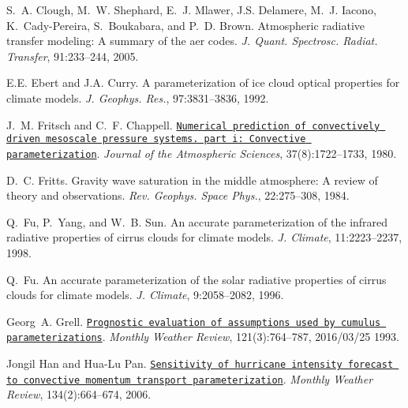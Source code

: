 \begin{DoxyDescription}
\item[\label{_CITEREF_clough_et_al_2005}%
\mbox{[}16\mbox{]}]S.~A. Clough, M.~W. Shephard, E.~J. Mlawer, J.\+S. Delamere, M.~J. Iacono, K.~Cady-\/\+Pereira, S.~Boukabara, and P.~D. Brown. Atmospheric radiative transfer modeling\+: A summary of the aer codes. {\itshape J. Quant. Spectrosc. Radiat. Transfer}, 91\+:233--244, 2005.


\item[\label{_CITEREF_ebert_and_curry_1992}%
\mbox{[}17\mbox{]}]E.\+E. Ebert and J.\+A. Curry. A parameterization of ice cloud optical properties for climate models. {\itshape J. Geophys. Res.}, 97\+:3831--3836, 1992.


\item[\label{_CITEREF_fritsch_and_chappell_1980}%
\mbox{[}18\mbox{]}]J.~M. Fritsch and C.~F. Chappell. \href{http://dx.doi.org/10.1175/1520-0469(1980)037<1722:NPOCDM>2.0.CO;2}{\tt Numerical prediction of convectively driven mesoscale pressure systems. part i\+: Convective parameterization}. {\itshape Journal of the Atmospheric Sciences}, 37(8)\+:1722--1733, 1980. 


\item[\label{_CITEREF_fritts_1984}%
\mbox{[}19\mbox{]}]D.~C. Fritts. Gravity wave saturation in the middle atmosphere\+: A review of theory and observations. {\itshape Rev. Geophys. Space Phys.}, 22\+:275--308, 1984.


\item[\label{_CITEREF_fu_et_al_1998}%
\mbox{[}20\mbox{]}]Q.~Fu, P.~Yang, and W.~B. Sun. An accurate parameterization of the infrared radiative properties of cirrus clouds for climate models. {\itshape J. Climate}, 11\+:2223--2237, 1998.


\item[\label{_CITEREF_fu_1996}%
\mbox{[}21\mbox{]}]Q.~Fu. An accurate parameterization of the solar radiative properties of cirrus clouds for climate models. {\itshape J. Climate}, 9\+:2058--2082, 1996.


\item[\label{_CITEREF_grell_1993}%
\mbox{[}22\mbox{]}]Georg~A. Grell. \href{http://dx.doi.org/10.1175/1520-0493(1993)121<0764:PEOAUB>2.0.CO;2}{\tt Prognostic evaluation of assumptions used by cumulus parameterizations}. {\itshape Monthly Weather Review}, 121(3)\+:764--787, 2016/03/25 1993. 


\item[\label{_CITEREF_han_and_pan_2006}%
\mbox{[}23\mbox{]}]Jongil Han and Hua-\/\+Lu Pan. \href{http://dx.doi.org/10.1175/MWR3090.1}{\tt Sensitivity of hurricane intensity forecast to convective momentum transport parameterization}. {\itshape Monthly Weather Review}, 134(2)\+:664--674, 2006. 



\end{DoxyDescription}
